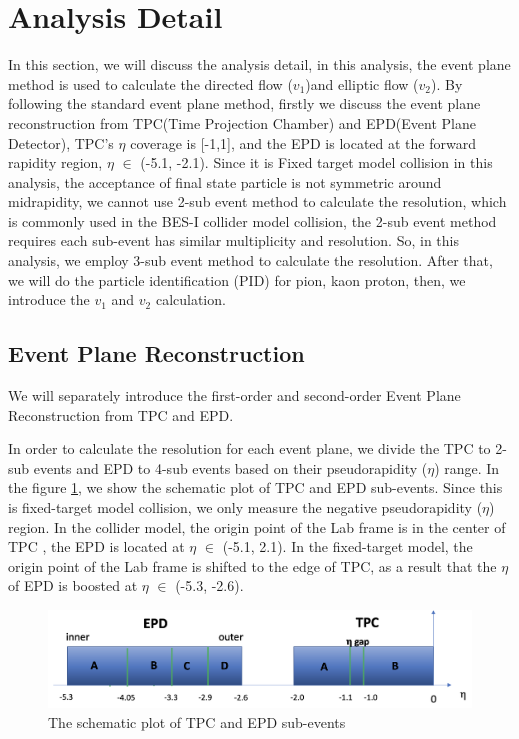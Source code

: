 \section{Analysis Detail}
In this section, we will discuss the analysis detail, in this analysis, the event plane method is used to calculate the directed flow ($v_{1}$)and elliptic flow ($v_{2}$). By following the standard event plane method, firstly we discuss the event plane reconstruction from TPC(Time Projection Chamber) and EPD(Event Plane Detector), TPC's $\eta$ coverage is [-1,1], and the EPD is located at the forward rapidity region, $\eta$ $\in$ (-5.1, -2.1). Since it is Fixed target model collision in this analysis, the acceptance of final state particle is not symmetric around midrapidity, we cannot use 2-sub event method to calculate the resolution, which is commonly used in the BES-I collider model collision, the 2-sub event method requires each sub-event has similar multiplicity and resolution. So, in this analysis, we employ 3-sub event method to calculate the resolution. After that, we will do the particle identification (PID) for pion, kaon proton, then, we introduce the $v_{1}$ and $v_{2}$ calculation.
\subsection{Event Plane Reconstruction}
We will separately introduce the first-order and second-order Event Plane Reconstruction from TPC and EPD.

In order to calculate the resolution for each event plane, we divide the TPC to 2-sub events and EPD to 4-sub events based on their pseudorapidity ($\eta$) range. In the figure \ref{fig:tpc_epd_div}, we show the schematic plot of TPC and EPD sub-events. Since this is fixed-target model collision, we only measure the negative pseudorapidity ($\eta$) region.  In the collider model, the origin point of the Lab frame is in the center of TPC , the EPD is located at $\eta$ $\in$ (-5.1, 2.1). In the fixed-target model, the origin point of the Lab frame is shifted to the edge of TPC, as a result that the $\eta$ of EPD is boosted at $\eta$ $\in$ (-5.3, -2.6).
\begin{figure}[hp]
\includegraphics[scale=0.3]{chapter2/fig/tpc_epd_div.png}
\caption{The schematic plot of TPC and EPD sub-events}
\label{fig:tpc_epd_div} 
\end{figure}

